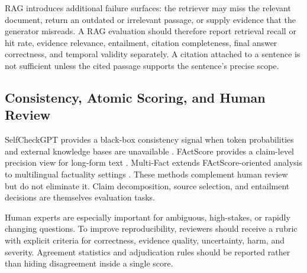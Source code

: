 \documentclass[manuscript,nonacm]{acmart}
\begin{document}
RAG introduces additional failure surfaces: the retriever may miss the relevant document, return an outdated or irrelevant passage, or supply evidence that the generator misreads. A RAG evaluation should therefore report retrieval recall or hit rate, evidence relevance, entailment, citation completeness, final answer correctness, and temporal validity separately. A citation attached to a sentence is not sufficient unless the cited passage supports the sentence's precise scope.

\subsection{Consistency, Atomic Scoring, and Human Review}\label{sec:consistency}
SelfCheckGPT provides a black-box consistency signal when token probabilities and external knowledge bases are unavailable \cite{manakul2023selfcheckgpt}. FActScore provides a claim-level precision view for long-form text \cite{min2023factscore}. Multi-Fact extends FActScore-oriented analysis to multilingual factuality settings \cite{shafayat2024multifact}. These methods complement human review but do not eliminate it. Claim decomposition, source selection, and entailment decisions are themselves evaluation tasks.

Human experts are especially important for ambiguous, high-stakes, or rapidly changing questions. To improve reproducibility, reviewers should receive a rubric with explicit criteria for correctness, evidence quality, uncertainty, harm, and severity. Agreement statistics and adjudication rules should be reported rather than hiding disagreement inside a single score.
\end{document}
